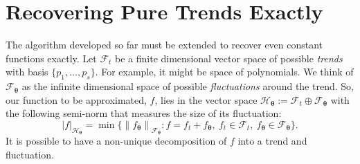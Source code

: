 \documentclass[]{mcom-l}
\theoremstyle{theorem}
\theoremstyle{remark}
\newcommand{\btheta}{{\boldsymbol{\theta}}}
\newcommand{\calf}{{\mathcal{F}}}
\newcommand{\calh}{{\mathcal{H}}}
\def\abs#1{\ensuremath{\left \lvert #1 \right \rvert}}
\newcommand{\norm}[2][{}]{\ensuremath{\left \lVert #2 \right \rVert}_{#1}}
\begin{document}
\section{Recovering Pure Trends Exactly} \label{sec:poly}

The algorithm developed so far must be extended to recover even constant functions exactly.  Let $\calf_t$ be a finite dimensional vector space of possible \emph{trends} with basis $\{p_1, \ldots, p_s\}$.  For example, it might be space of polynomials.  We think of $\calf_{\btheta}$ as the infinite dimensional space of possible \emph{fluctuations} around the trend.  So, our function to be approximated, $f$, lies in the vector space $\calh_\btheta := \calf_t \oplus \calf_\btheta$ with the following semi-norm that measures the size of its fluctuation:
\begin{equation} \label{eq:seminorm} 
\abs{f}_{\calh_\btheta} = \min \{ \norm[\calf_\btheta] {f_\btheta} : f = f_t + f_\btheta, \ f_t \in \calf_t, \ f_\btheta \in \calf_\btheta \}.
\end{equation}
It is possible to have a non-unique decomposition of $f$ into a trend and fluctuation.
\end{document}
